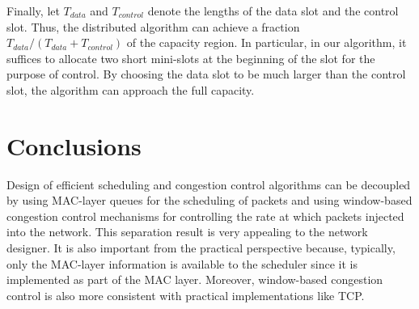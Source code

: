 \documentclass[10pt,onecolumn,draftclsnofoot,journal]{IEEEtran}
\begin{document}
Finally, let $T_{data}$ and $T_{control}$ denote the lengths of the data slot and the control slot. Thus, the distributed algorithm can achieve a fraction ${T_{data}}/(T_{data}+T_{control})$ of the capacity region. In particular, in our algorithm, it suffices to allocate two short mini-slots at the beginning of the slot for the purpose of control. By choosing the data slot to be much larger than the control slot, the algorithm can approach the full capacity.

\section{Conclusions}\label{conclusion}
Design of efficient scheduling and congestion control algorithms can be decoupled by using MAC-layer queues for the scheduling of packets and using window-based congestion control mechanisms for controlling the rate at which packets injected into the network. This separation result is very appealing to the network designer. It is also important from the practical perspective because, typically, only the MAC-layer information is available to the scheduler since it is implemented as part of the MAC layer. Moreover, window-based congestion control is also more consistent with practical implementations like TCP.
\end{document}

